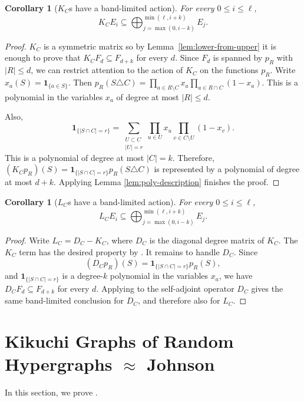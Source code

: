 \documentclass
[11pt,letterpaper]
{article}
\newtheorem{corollary}[theorem]{Corollary}
\newcommand{\one}{\mathbf 1}
\begin{document}
\begin{corollary}[$K_C$s have a band-limited action] \label{cor:band-limited-action}
For every \(0\le i\le \ell\),
\[
K_C E_i
\subseteq
\bigoplus_{j=\max(0,i-k)}^{\min(\ell,i+k)} E_j.
\]
\end{corollary}

\begin{proof}
$K_C$ is a symmetric matrix so by Lemma~\ref{lem:lower-from-upper} it is enough to prove that 
$K_C F_d\subseteq F_{d+k}$ 
for every \(d\). Since $F_d$ is spanned by \(p_R\) with \(|R|\le d\), we can restrict attention to the action of $K_C$ on the functions $p_R$. Write $x_a(S)=\one_{\{a\in S\}}$.
Then
$p_R(S\triangle C)
=
\prod_{a\in R\setminus C} x_a
\prod_{a\in R\cap C} (1-x_a)$.
This is a polynomial in the variables \(x_a\) of degree at most \(|R|\le d\).

Also,
\[
\one_{\{|S\cap C|=r\}}
=
\sum_{\substack{U\subset C\\ |U|=r}}
\prod_{u\in U} x_u
\prod_{v\in C\setminus U} (1-x_v).
\]
This is a polynomial of degree at most \(|C|=k\). Therefore, 
$(K_Cp_R)(S) = \one_{\{|S\cap C|=r\}}p_R(S\triangle C)$
is represented by a polynomial of degree at most \(d+k\). Applying Lemma \ref{lem:poly-description} finishes the proof. 
\end{proof}

\begin{corollary}[$L_C$s have a band-limited action] \label{cor:band-limited-action-laplacian}
For every \(0\le i\le \ell\),
\[
L_C E_i
\subseteq
\bigoplus_{j=\max(0,i-k)}^{\min(\ell,i+k)} E_j.
\]
\end{corollary}

\begin{proof}
Write $L_C = D_C - K_C$, where $D_C$ is the diagonal degree matrix of $K_C$. The $K_C$ term has the desired property by . It remains to handle $D_C$. Since
\[
(D_C p_R)(S)=\one_{\{|S\cap C|=r\}}p_R(S),
\]
and $\one_{\{|S\cap C|=r\}}$ is a degree-$k$ polynomial in the variables $x_a$, we have $D_C F_d \subseteq F_{d+k}$ for every $d$. Applying  to the self-adjoint operator $D_C$ gives the same band-limited conclusion for $D_C$, and therefore also for $L_C$.
\end{proof}



\section{Kikuchi Graphs of Random Hypergraphs $\approx$ Johnson} \label{sec:kikuchi-sparsification-even}
In this section, we prove .
\end{document}
